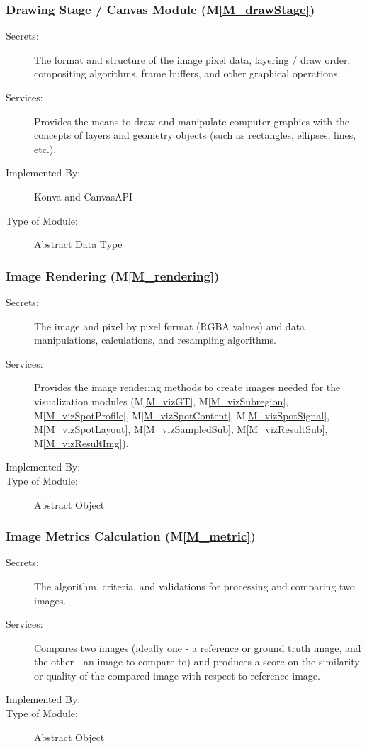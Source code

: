 \documentclass[12pt, titlepage]{article}
\newcommand{\mref}[1]{M\ref{#1}}
\begin{document}
\subsubsection{Drawing Stage / Canvas Module (\mref{M_drawStage})}
\begin{description}
\item[Secrets:] The format and structure of the image pixel data, layering / draw order,
  compositing algorithms, frame buffers, and other graphical operations.
\item[Services:] Provides the means to draw and manipulate computer graphics with the
  concepts of layers and geometry objects (such as rectangles, ellipses, lines, etc.).
\item[Implemented By:] Konva and CanvasAPI
\item[Type of Module:] Abstract Data Type
\end{description}


\subsubsection{Image Rendering (\mref{M_rendering})}
\begin{description}
\item[Secrets:] The image and pixel by pixel format (RGBA values) and data manipulations,
  calculations, and resampling algorithms.
\item[Services:] Provides the image rendering methods to create images needed for
  the visualization modules (\mref{M_vizGT}, \mref{M_vizSubregion},
  \mref{M_vizSpotProfile}, \mref{M_vizSpotContent}, \mref{M_vizSpotSignal},
  \mref{M_vizSpotLayout}, \mref{M_vizSampledSub}, \mref{M_vizResultSub},
  \mref{M_vizResultImg}).
\item[Implemented By:] \progname{}
\item[Type of Module:] Abstract Object
\end{description}


\subsubsection{Image Metrics Calculation (\mref{M_metric})}
\begin{description}
\item[Secrets:] The algorithm, criteria, and validations for processing and comparing two images.
\item[Services:] Compares two images (ideally one - a reference or ground truth image, 
  and the other - an image to compare to) and produces a score on the 
  similarity or quality of the compared image with respect to reference image.
\item[Implemented By:] \progname{}
\item[Type of Module:] Abstract Object
\end{description}
\end{document}
